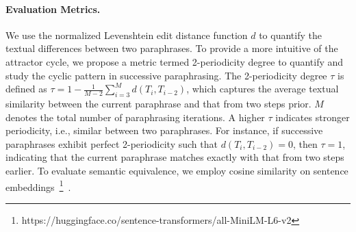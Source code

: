 \paragraph{Evaluation Metrics.}
We use the normalized Levenshtein edit distance function $d$ to quantify the textual differences between two paraphrases.
To provide a more intuitive of the attractor cycle, we propose a metric termed 2-periodicity degree to quantify and study the cyclic pattern in successive paraphrasing.
The 2-periodicity degree \(\tau\) is defined as $\tau = 1 - \frac{1}{M-2} \sum_{i=3}^{M} d(T_{i}, T_{i-2})$, which captures the average textual similarity between the current paraphrase and that from two steps prior. 
$M$ denotes the total number of paraphrasing iterations. 
A higher $\tau$ indicates stronger periodicity, i.e., similar between two paraphrases. 
For instance, if successive paraphrases exhibit perfect 2-periodicity such that \(d(T_{i}, T_{i-2}) = 0\), then \(\tau = 1\), indicating that the current paraphrase matches exactly with that from two steps earlier. 
To evaluate semantic equivalence, we employ cosine similarity on sentence embeddings~\footnote{https://huggingface.co/sentence-transformers/all-MiniLM-L6-v2}~\cite{sentence_embed}.






